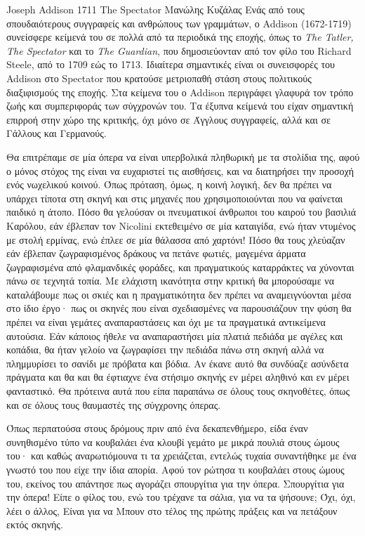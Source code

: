 \translationsetup
    {Joseph Addison}
    {1711}
    {The Spectator}
    {Μανώλης Κυζάλας}
    {Ενάς από τους σπουδαιότερους συγγραφείς και ανθρώπους των γραμμάτων, ο Addison (1672-1719) συνείσφερε κείμενά του σε πολλά από τα περιοδικά της εποχής, όπως το \emph{The Tatler, The Spectator} και το \emph{The Guardian}, που δημοσιεύονταν από τον φίλο του Richard Steele, από το 1709 εώς το 1713. Ιδιαίτερα σημαντικές είναι οι συνεισφορές του Addison στο Spectator που κρατούσε μετριοπαθή στάση στους πολιτικούς διαξιφισμούς της εποχής. Στα κείμενα του ο Addison περιγράφει γλαφυρά τον τρόπο ζωής και συμπεριφοράς των σύγχρονών του. Τα έξυπνα κείμενά του είχαν σημαντική επιρροή στην χώρο της κριτικής, όχι μόνο σε Άγγλους συγγραφείς, αλλά και σε Γάλλους και Γερμανούς.}
    
Θα επιτρέπαμε σε μία όπερα να είναι υπερβολικά πληθωρική με τα στολίδια της, αφού ο μόνος στόχος της είναι να ευχαριστεί τις αισθήσεις, και να διατηρήσει την προσοχή ενός νωχελικού κοινού. Όπως πρόταση, όμως, η κοινή λογική, δεν θα πρέπει να υπάρχει τίποτα στη σκηνή και στις μηχανές που χρησιμοποιούνται που να φαίνεται παιδικό η άτοπο. Πόσο θα γελούσαν οι πνευματικοί άνθρωποι του καιρού του βασιλιά Καρόλου, εάν έβλεπαν τον Nicolini εκτεθειμένο σε μία καταιγίδα, ενώ ήταν ντυμένος με στολή ερμίνας, ενώ έπλεε σε μία θάλασσα από χαρτόνι! Πόσο θα τους χλεύαζαν εάν έβλεπαν ζωγραφισμένος δράκους να πετάνε φωτιές, μαγεμένα άρματα ζωγραφισμένα από φλαμανδικές φοράδες, και πραγματικούς καταρράκτες να χύνονται πάνω σε τεχνητά τοπία. Με ελάχιστη ικανότητα στην κριτική θα μπορούσαμε να καταλάβουμε πως οι σκιές και η πραγματικότητα δεν πρέπει να αναμειγνύονται μέσα στο ίδιο έργο· πως οι σκηνές που είναι σχεδιασμένες να παρουσιάζουν την φύση θα πρέπει να είναι γεμάτες αναπαραστάσεις και όχι με τα πραγματικά αντικείμενα αυτούσια. Εάν κάποιος ήθελε να αναπαραστήσει μία πλατιά πεδιάδα με αγέλες και κοπάδια, θα ήταν γελοίο να ζωγραφίσει την πεδιάδα πάνω στη σκηνή αλλά να πλημμυρίσει το σανίδι με πρόβατα και βόδια. Αν έκανε αυτό θα συνδύαζε ασύνδετα πράγματα και θα και θα έφτιαχνε ένα στήσιμο σκηνής εν μέρει αληθινό και εν μέρει φανταστικό. Θα πρότεινα αυτά που είπα παραπάνω σε όλους τους σκηνοθέτες, όπως και σε όλους τους θαυμαστές της σύγχρονης όπερας.

Όπως περπατούσα στους δρόμους πριν από ένα δεκαπενθήμερο, είδα έναν συνηθισμένο τύπο να κουβαλάει ένα κλουβί γεμάτο με μικρά πουλιά στους ώμους του· και καθώς αναρωτιόμουνα τι τα χρειάζεται, εντελώς τυχαία συναντήθηκε με ένα γνωστό του που είχε την ίδια απορία. Αφού τον ρώτησα τι κουβαλάει στους ώμους του, εκείνος του απάντησε πως αγοράζει σπουργίτια για την όπερα. Σπουργίτια για την όπερα! Είπε ο φίλος του, ενώ του τρέχανε τα σάλια, για να τα ψήσουνε; Όχι, όχι, λέει ο άλλος, Είναι για να Μπουν στο τέλος της πρώτης πράξεις και να πετάξουν εκτός σκηνής.

